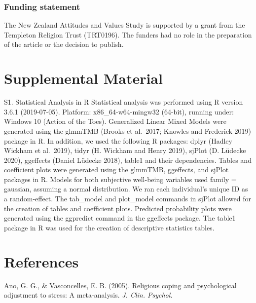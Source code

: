 \documentclass[
  english,
  man]{apa6}
\begin{document}
\hypertarget{funding-statement}{%
\subsubsection{Funding statement}\label{funding-statement}}

The New Zealand Attitudes and Values Study is supported by a grant from the Templeton
Religion Trust (TRT0196). The funders had no role in the preparation of the article or the
decision to publish.

\hypertarget{supplemental-material}{%
\section{Supplemental Material}\label{supplemental-material}}

S1. Statistical Analysis in R
Statistical analysis was performed using R version 3.6.1 (2019-07-05). Platform: x86\_64-w64-mingw32 (64-bit), running under: Windows 10 (Action of the Toes). Generalized Linear Mixed Models were generated using the glmmTMB (Brooks et al.~2017; Knowles and Frederick 2019) package in R. In addition, we used the following R packages: dplyr (Hadley Wickham et al.~2019), tidyr (H. Wickham and Henry 2019), sjPlot (D. Lüdecke 2020), ggeffects (Daniel Lüdecke 2018), table1 and their dependencies.
Tables and coefficient plots were generated using the glmmTMB, ggeffects, and sjPlot packages in R. Models for both subjective well-being variables used family = gaussian, assuming a normal distribution. We ran each individual's unique ID as a random-effect. The tab\_model and plot\_model commands in sjPlot allowed for the creation of tables and coefficient plots. Predicted probability plots were generated using the ggpredict command in the ggeffects package. The table1 package in R was used for the creation of descriptive statistics tables.

\newpage

\hypertarget{references}{%
\section{References}\label{references}}

\begingroup
\setlength{\parindent}{-0.5in}
\setlength{\leftskip}{0.5in}

\hypertarget{refs}{}
\leavevmode\hypertarget{ref-Ano2005-hx}{}%
Ano, G. G., \& Vasconcelles, E. B. (2005). Religious coping and psychological adjustment to stress: A meta‐analysis. \emph{J. Clin. Psychol.}
\end{document}
